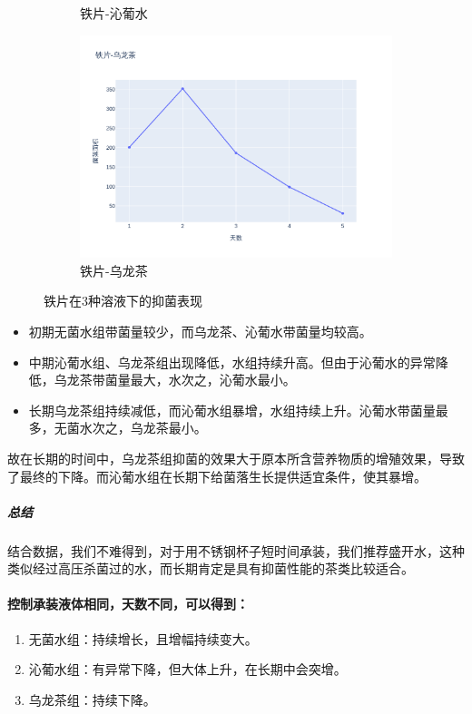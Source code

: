 \documentclass[12pt,a4paper]{ctexart}
\begin{document}
\begin{figure}[htbp]
\begin{subfigure}[b]{0.31\textwidth}
        \caption{铁片-沁葡水}
        \label{subfig:2}
    \end{subfigure}
    \hfill  %
    \begin{subfigure}[b]{0.31\textwidth}
        \centering
        \includegraphics[width=\linewidth]{./plot/SingleMaterial/iron/铁片-乌龙茶_line.png}
        \caption{铁片-乌龙茶}
        \label{subfig:3}
    \end{subfigure}
    \caption{铁片在3种溶液下的抑菌表现}
    \label{fig:triple_horizontal}  %
\end{figure}
\begin{itemize}
    \item 初期无菌水组带菌量较少，而乌龙茶、沁葡水带菌量均较高。
    \item 中期沁葡水组、乌龙茶组出现降低，水组持续升高。但由于沁葡水的异常降低，乌龙茶带菌量最大，水次之，沁葡水最小。
    \item 长期乌龙茶组持续减低，而沁葡水组暴增，水组持续上升。沁葡水带菌量最多，无菌水次之，乌龙茶最小。
\end{itemize}

故在长期的时间中，乌龙茶组抑菌的效果大于原本所含营养物质的增殖效果，导致了最终的下降。而沁葡水组在长期下给菌落生长提供适宜条件，使其暴增。

\subparagraph{总结}
结合数据，我们不难得到，对于用不锈钢杯子短时间承装，我们推荐盛开水，这种类似经过高压杀菌过的水，而长期肯定是具有抑菌性能的茶类比较适合。




\paragraph{控制承装液体相同，天数不同，可以得到：}
\begin{enumerate}
    \item 无菌水组：持续增长，且增幅持续变大。
    \item 沁葡水组：有异常下降，但大体上升，在长期中会突增。
    \item 乌龙茶组：持续下降。
\end{enumerate}
 
\end{document}
